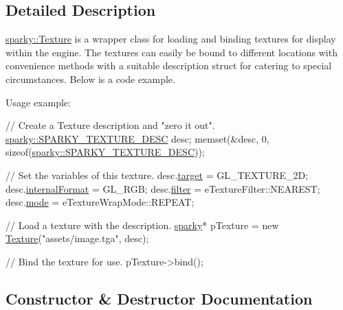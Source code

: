 \subsection{Detailed Description}
\hyperlink{classsparky_1_1_texture}{sparky\+::\+Texture} is a wrapper class for loading and binding textures for display within the engine. The textures can easily be bound to different locations with convenience methods with a suitable description struct for catering to special circumstances. Below is a code example.

Usage example\+: 
\begin{DoxyCode}
\textcolor{comment}{// Create a Texture description and "zero it out".}
\hyperlink{structsparky_1_1_s_p_a_r_k_y___t_e_x_t_u_r_e___d_e_s_c}{sparky::SPARKY\_TEXTURE\_DESC} desc;
memset(&desc, 0, \textcolor{keyword}{sizeof}(\hyperlink{structsparky_1_1_s_p_a_r_k_y___t_e_x_t_u_r_e___d_e_s_c}{sparky::SPARKY\_TEXTURE\_DESC}));

\textcolor{comment}{// Set the variables of this texture.}
desc.\hyperlink{structsparky_1_1_s_p_a_r_k_y___t_e_x_t_u_r_e___d_e_s_c_aa16d4a1609584eecae520984f0c844fa}{target}         = GL\_TEXTURE\_2D;
desc.\hyperlink{structsparky_1_1_s_p_a_r_k_y___t_e_x_t_u_r_e___d_e_s_c_a41118481a1e1ebbae3ff6909d583112a}{internalFormat} = GL\_RGB;
desc.\hyperlink{structsparky_1_1_s_p_a_r_k_y___t_e_x_t_u_r_e___d_e_s_c_a578a5137068a9f9bb9a672931928ae04}{filter}         = eTextureFilter::NEAREST;
desc.\hyperlink{structsparky_1_1_s_p_a_r_k_y___t_e_x_t_u_r_e___d_e_s_c_a9b527f02b0469a529c146bcf14574dcb}{mode}           = eTextureWrapMode::REPEAT;

\textcolor{comment}{// Load a texture with the description.}
\hyperlink{namespacesparky}{sparky}* pTexture = \textcolor{keyword}{new} \hyperlink{classsparky_1_1_texture_aa4d414b3e015de45973399d3765ea900}{Texture}(\textcolor{stringliteral}{"assets/image.tga"}, desc);

\textcolor{comment}{// Bind the texture for use.}
pTexture->bind();
\end{DoxyCode}
 

\subsection{Constructor \& Destructor Documentation}
